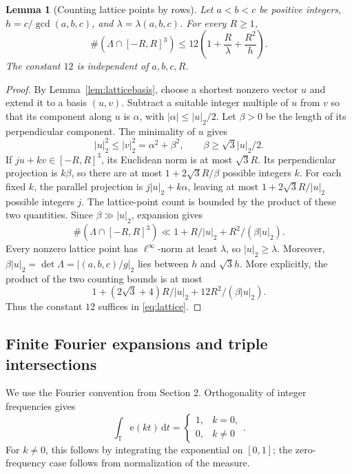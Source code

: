 \documentclass[12pt,leqno]{article}
\numberwithin{equation}{section}
\newtheorem{lemma}[theorem]{Lemma}
\theoremstyle{remark}
\newcommand{\LRtorus}{\mathbb T}
\newcommand{\LRdifferential}{\,\mathrm d}
\begin{document}
\begin{lemma}[Counting lattice points by rows]\label{lem:latticecount}
Let $a<b<c$ be positive integers, $h=c/\gcd(a,b,c)$, and $\lambda=\lambda(a,b,c)$. For every $R\ge1$,
\begin{equation}\label{eq:lattice}
\#(\Lambda\cap[-R,R]^3)\le12\left(1+\frac R\lambda+\frac{R^2}h\right).
\end{equation}
The constant $12$ is independent of $a,b,c,R$.
\end{lemma}
\begin{proof}
By Lemma~\ref{lem:latticebasis}, choose a shortest nonzero vector $u$ and extend it to a basis $(u,v)$. Subtract a suitable integer multiple of $u$ from $v$ so that its component along $u$ is $\alpha$, with $|\alpha|\le|u|_2/2$. Let $\beta>0$ be the length of its perpendicular component. The minimality of $u$ gives
\[
|u|_2^2\le |v|_2^2=\alpha^2+\beta^2,
\qquad \beta\ge\sqrt3|u|_2/2.
\]
If $ju+kv\in[-R,R]^3$, its Euclidean norm is at most $\sqrt3R$. Its perpendicular projection is $k\beta$, so there are at most $1+2\sqrt3R/\beta$ possible integers $k$. For each fixed $k$, the parallel projection is $j|u|_2+k\alpha$, leaving at most $1+2\sqrt3R/|u|_2$ possible integers $j$. The lattice-point count is bounded by the product of these two quantities. Since $\beta\gg|u|_2$, expansion gives
\[
\#(\Lambda\cap[-R,R]^3)
\ll1+R/|u|_2+R^2/(\beta|u|_2).
\]
Every nonzero lattice point has $\ell^\infty$-norm at least $\lambda$, so $|u|_2\ge\lambda$. Moreover,
$\beta|u|_2=\det\Lambda=|(a,b,c)/g|_2$ lies between $h$ and $\sqrt3h$. More explicitly, the product of the two counting bounds is at most
\[
1+(2\sqrt3+4)R/|u|_2+12R^2/(\beta|u|_2).
\]
Thus the constant $12$ suffices in \eqref{eq:lattice}.
\end{proof}

\subsection{Finite Fourier expansions and triple intersections}
We use the Fourier convention from Section 2. Orthogonality of integer frequencies gives
\begin{equation}\label{eq:orthogonality}
\int_{\LRtorus}\mathrm e(kt)\LRdifferential t=
\begin{cases}1,&k=0,\\0,&k\ne0\end{cases}.
\end{equation}
For $k\ne0$, this follows by integrating the exponential on $[0,1]$; the zero-frequency case follows from normalization of the measure.
\end{document}

